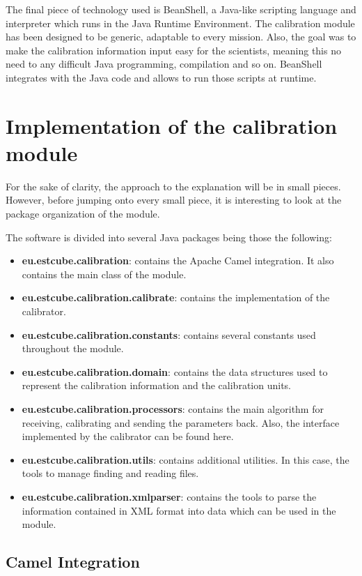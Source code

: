 The final piece of technology used is BeanShell\citep{BSH}, a Java-like scripting language and interpreter which runs in the Java Runtime Environment. The calibration module has been designed to be generic, adaptable to every mission. Also, the goal was to make the calibration information input easy for the scientists, meaning this no need to any difficult Java programming, compilation and so on. BeanShell integrates with the Java code and allows to run those scripts at runtime.

\section{Implementation of the calibration module}

For the sake of clarity, the approach to the explanation will be in small pieces. However, before jumping onto every small piece, it is interesting to look at the package organization of the module.

The software is divided into several Java packages being those the following:
\begin{itemize}
\item \textbf{eu.estcube.calibration}: contains the Apache Camel integration. It also contains the main class of the module.
\item \textbf{eu.estcube.calibration.calibrate}: contains the implementation of the calibrator.
\item \textbf{eu.estcube.calibration.constants}: contains several constants used throughout the module.
\item \textbf{eu.estcube.calibration.domain}: contains the data structures used to represent the calibration information and the calibration units.
\item \textbf{eu.estcube.calibration.processors}: contains the main algorithm for receiving, calibrating and sending the parameters back. Also, the interface implemented by the calibrator can be found here.
\item \textbf{eu.estcube.calibration.utils}: contains additional utilities. In this case, the tools to manage finding and reading files.
\item \textbf{eu.estcube.calibration.xmlparser}: contains the tools to parse the information contained in XML format into data which can be used in the module.
\end{itemize}

\subsection{Camel Integration}


